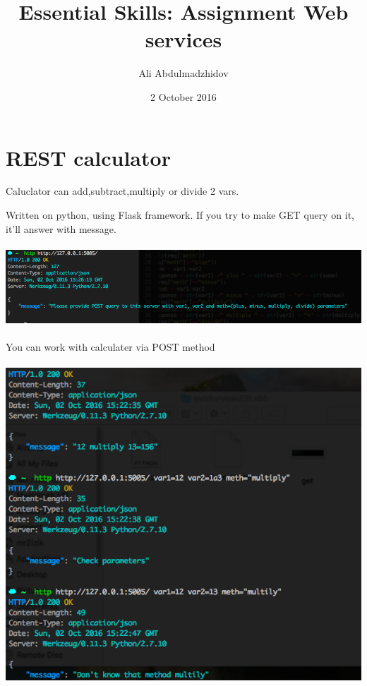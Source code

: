 \documentclass[10pt]{article}
\title{Essential Skills: Assignment Web services}
\date{2 October 2016}
\author{Ali Abdulmadzhidov}
\begin{document}
\renewcommand*\rmdefault{cmss}
\maketitle
\section{REST calculator}
Caluclator can add,subtract,multiply or divide 2 vars.

Written on python, using Flask framework.
If you try to make GET query on it, it'll answer with message. \\ \\
\includegraphics[scale=0.5]{get} \\ \\
You can work with calculater via POST method \\ \\ 
\includegraphics[scale=0.5]{post}
\end{document}

